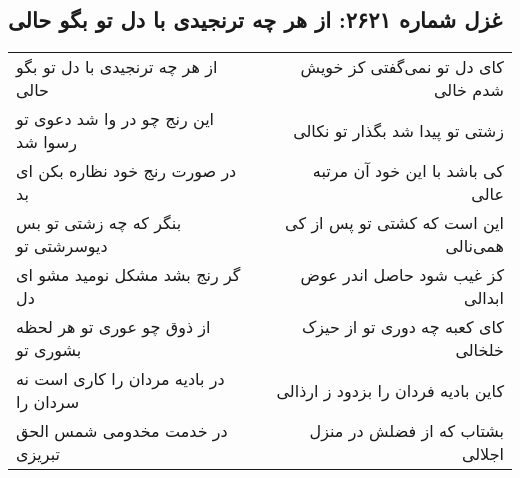 \begin{center}
\section*{غزل شماره ۲۶۲۱: از هر چه ترنجیدی با دل تو بگو حالی}
\label{sec:2621}
\begin{longtable}{l p{0.5cm} r}
از هر چه ترنجیدی با دل تو بگو حالی
&&
کای دل تو نمی‌گفتی کز خویش شدم خالی
\\
این رنج چو در وا شد دعوی تو رسوا شد
&&
زشتی تو پیدا شد بگذار تو نکالی
\\
در صورت رنج خود نظاره بکن ای بد
&&
کی باشد با این خود آن مرتبه عالی
\\
بنگر که چه زشتی تو بس دیوسرشتی تو
&&
این است که کشتی تو پس از کی همی‌نالی
\\
گر رنج بشد مشکل نومید مشو ای دل
&&
کز غیب شود حاصل اندر عوض ابدالی
\\
از ذوق چو عوری تو هر لحظه بشوری تو
&&
کای کعبه چه دوری تو از حیزک خلخالی
\\
در بادیه مردان را کاری است نه سردان را
&&
کاین بادیه فردان را بزدود ز ارذالی
\\
در خدمت مخدومی شمس الحق تبریزی
&&
بشتاب که از فضلش در منزل اجلالی
\\
\end{longtable}
\end{center}
